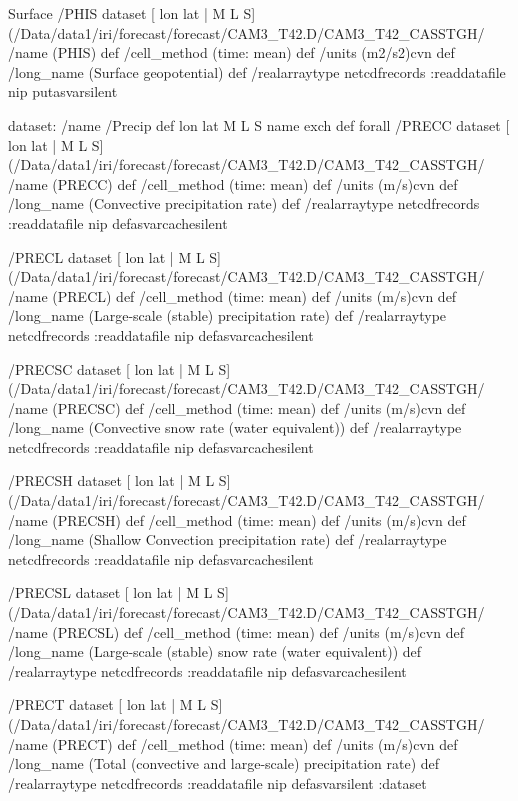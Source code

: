 \begin{ingrid}
Surface /PHIS{
dataset
[ lon lat | M L S] (/Data/data1/iri/forecast/forecast/CAM3_T42.D/CAM3_T42_CASSTGH/%
/name (PHIS) def
 /cell_method (time: mean) def
 /units (m2/s2)cvn def
 /long_name (Surface geopotential) def
 /realarraytype netcdfrecords :readdatafile
nip
}putasvarsilent

dataset: /name /Precip def
 { lon lat  M L S } {name exch def} forall
 /PRECC{
dataset
[ lon lat | M L S] (/Data/data1/iri/forecast/forecast/CAM3_T42.D/CAM3_T42_CASSTGH/%
/name (PRECC) def
 /cell_method (time: mean) def
 /units (m/s)cvn def
 /long_name (Convective precipitation rate) def
 /realarraytype netcdfrecords :readdatafile
nip
}defasvarcachesilent

 /PRECL{
dataset
[ lon lat | M L S] (/Data/data1/iri/forecast/forecast/CAM3_T42.D/CAM3_T42_CASSTGH/%
/name (PRECL) def
 /cell_method (time: mean) def
 /units (m/s)cvn def
 /long_name (Large-scale (stable) precipitation rate) def
 /realarraytype netcdfrecords :readdatafile
nip
}defasvarcachesilent

/PRECSC{
dataset
[ lon lat | M L S] (/Data/data1/iri/forecast/forecast/CAM3_T42.D/CAM3_T42_CASSTGH/%
/name (PRECSC) def
 /cell_method (time: mean) def
 /units (m/s)cvn def
 /long_name (Convective snow rate (water equivalent)) def
 /realarraytype netcdfrecords :readdatafile
nip
}defasvarcachesilent

/PRECSH{
dataset
[ lon lat | M L S] (/Data/data1/iri/forecast/forecast/CAM3_T42.D/CAM3_T42_CASSTGH/%
/name (PRECSH) def
 /cell_method (time: mean) def
 /units (m/s)cvn def
 /long_name (Shallow Convection precipitation rate) def
 /realarraytype netcdfrecords :readdatafile
nip
}defasvarcachesilent

/PRECSL{
dataset
[ lon lat | M L S] (/Data/data1/iri/forecast/forecast/CAM3_T42.D/CAM3_T42_CASSTGH/%
/name (PRECSL) def
 /cell_method (time: mean) def
 /units (m/s)cvn def
 /long_name (Large-scale (stable) snow rate (water equivalent)) def
 /realarraytype netcdfrecords :readdatafile
nip
}defasvarcachesilent

/PRECT{
dataset
[ lon lat | M L S] (/Data/data1/iri/forecast/forecast/CAM3_T42.D/CAM3_T42_CASSTGH/%
/name (PRECT) def
 /cell_method (time: mean) def
 /units (m/s)cvn def
 /long_name (Total (convective and large-scale) precipitation rate) def
 /realarraytype netcdfrecords :readdatafile
nip
}defasvarsilent
:dataset



\end{ingrid}
